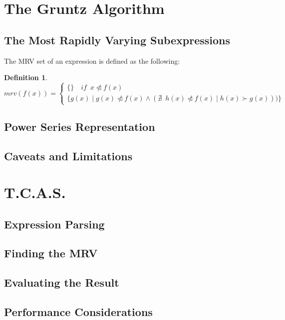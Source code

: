 \documentclass{article}
\theoremstyle{plain}
\theoremstyle{definition}
\newtheorem{defn}[thm]{Definition}
\begin{document}
	\section{The Gruntz Algorithm}
	
	\subsection{The Most Rapidly Varying Subexpressions}
	
	The MRV set of an expression is defined as the following:
	
	\begin{defn}
	    \[
	    mrv(f(x)) = \begin{cases}
	    	\{\} \quad if \enspace x \ntriangleleft f(x) \\
	    	\{g(x) \mid g(x) \ntriangleleft f(x) \wedge (\nexists \enspace h(x) \ntriangleleft f(x) \mid h(x) \succ g(x)))\}
	    \end{cases}
    	\]
	\end{defn}
	
	\subsection{Power Series Representation}
	
	\subsection{Caveats and Limitations}
	
	\section{T.C.A.S.}
	
	\subsection{Expression Parsing}
	
	\subsection{Finding the MRV}
	
	\subsection{Evaluating the Result}
	
	\subsection{Performance Considerations}
	
\end{document}
